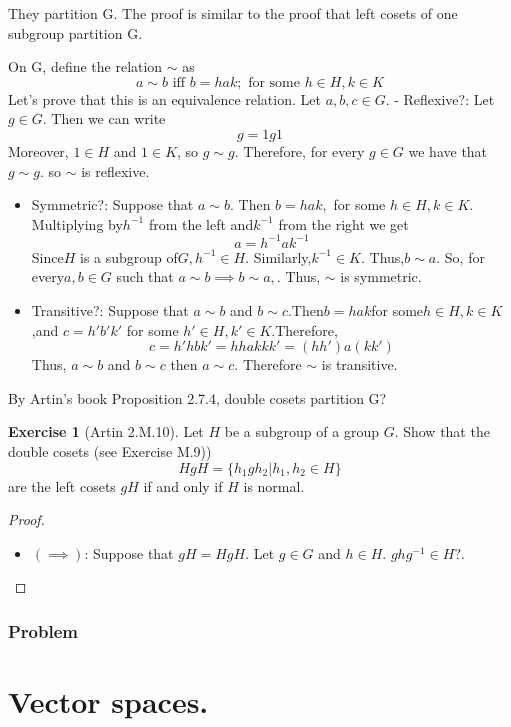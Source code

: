 \documentclass[
]{book}
\providecommand{\tightlist}{%
  \setlength{\itemsep}{0pt}\setlength{\parskip}{0pt}}
\theoremstyle{definition}
\theoremstyle{definition}
\theoremstyle{definition}
\newtheorem{exercise}{Exercise}[chapter]
\theoremstyle{definition}
\theoremstyle{remark}
\begin{document}
They partition G. The proof is similar to the proof that left cosets of one subgroup partition G.

On G, define the relation \(\sim\) as
\[ a \sim b \text{ iff } b = hak; \text{ for some } h \in H, k \in K\]
Let's prove that this is an equivalence relation.
Let \(a,b,c\in G\).
- Reflexive?:
Let \(g \in G\). Then we can write
\[ g = 1g1\]
Moreover, \(1 \in H\) and \(1 \in K\), so \(g \sim g\).
Therefore, for every \(g \in G\) we have that \(g \sim g\). so \(\sim\) is reflexive.

\begin{itemize}
\item
  Symmetric?:
  Suppose that \(a \sim b.\) Then \(b = hak,\) for some \(h \in H, k \in K.\) Multiplying by\(h^{-1}\) from the left and\(k^{-1}\) from the right we get
  \[ a = h^{-1}ak^{-1}\]
  Since\(H\) is a subgroup of\(G,h^{-1} \in H.\) Similarly,\(k^{-1} \in K.\) Thus,\(b \sim a.\)
  So, for every\(a,b \in G\) such that \(a \sim b\implies b \sim a,\). Thus, \(\sim\) is symmetric.
\item
  Transitive?:
  Suppose that \(a \sim b\) and \(b \sim c\).Then\(b = hak\)for some\(h \in H,k \in K\),and \(c=h'b'k'\) for some \(h' \in H,k' \in K\).Therefore,
  \[c=h'hbk'=hhakkk'= (hh')a(kk')\]
  Thus, \(a\sim b\) and \(b\sim c\) then \(a\sim c\). Therefore \(\sim\) is transitive.
\end{itemize}

By Artin's book Proposition 2.7.4, double cosets partition G?

\begin{exercise}[Artin 2.M.10]
\protect\hypertarget{exr:unnamed-chunk-224}{}\label{exr:unnamed-chunk-224}Let \(H\) be a subgroup of a group \(G\). Show that the double cosets (see Exercise M.9))
\[HgH = \{h_1gh_2 | h_1, h_2 \in H\}\]
are the left cosets \(gH\) if and only if \(H\) is normal.
\end{exercise}

\begin{proof}
\leavevmode

\begin{itemize}
\tightlist
\item
  \((\implies)\): Suppose that \(gH=HgH\). Let \(g\in G\) and \(h\in H\).
  \(ghg^{-1}\in H?\).
\end{itemize}

\end{proof}

\hypertarget{problem-3}{%
\subsection{Problem}\label{problem-3}}

\hypertarget{vector-spaces.}{%
\chapter{Vector spaces.}\label{vector-spaces.}}

  
\end{document}
